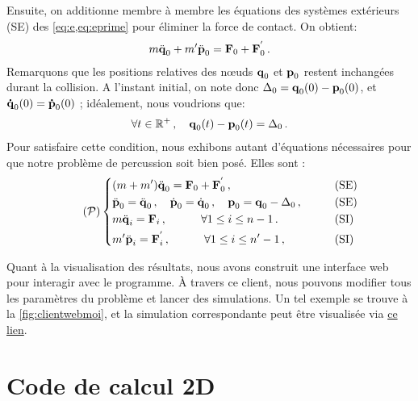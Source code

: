 \noindent Ensuite, on additionne membre à membre les équations des systèmes extérieurs (SE) des \cref{eq:e,eq:eprime} pour éliminer la force de contact. On obtient:
\begin{align}
m \ddot{\bm{\mathrm{q}}}_0 + m' \ddot{\bm{\mathrm{p}}}_0 = \bm{\mathrm{F}}_0 + \bm{\mathrm{F}}^{'}_0 \,.
\end{align}
Remarquons que les positions relatives des n\oe{}uds $\bm{\mathrm{q}}_0$ et $\bm{\mathrm{p}}_0$ restent inchangées durant la collision. A l'instant initial, on note donc $\Delta_0 = \bm{\mathrm{q}}_0(0) - \bm{\mathrm{p}}_0(0)$, et $\bm{\mathrm{\dot q}}_0(0) = \bm{\mathrm{\dot p}}_0(0)$ ; idéalement, nous voudrions que:
\begin{align}
\forall t \in \mathbb{R}^+ \,, \quad \bm{\mathrm{q}}_0(t) - \bm{\mathrm{p}}_0(t) = \Delta_0\,.
\end{align}
Pour satisfaire cette condition, nous exhibons autant d'équations nécessaires pour que notre problème de percussion soit bien posé. Elles sont :
\begin{align} \tag{$\mathcal{P}$} \label{eq:problemeP}
\begin{dcases}
    (m+m') \ddot{\bvec{q}}_0  = \bvec{F}_0 + \bvec{F}^{'}_0  \,, &\qquad \text{(SE)} \\
    \ddot{\bvec{p}}_0 = \ddot{\bvec{q}}_0 \,, \quad \dot{\bvec{p}}_0 = \dot{\bvec{q}}_0 \,, \quad \bvec{p}_0 = \bvec{q}_0 - \Delta_0 \,, &\qquad \text{(SE)} \\
    m \ddot{\bvec{q}}_i = \bvec{F}_i   \,, \quad \quad \quad \forall 1 \leq i \leq n-1 \,. &\qquad \text{(SI)} \\
    m' \ddot{\bvec{p}}_i = \bvec{F}^{'}_i   \,, \quad \quad \quad \forall 1 \leq i \leq n'-1 \,, &\qquad \text{(SI)}
\end{dcases}
\end{align}

Quant à la visualisation des résultats, nous avons construit une interface web pour interagir avec le programme. À travers ce client, nous pouvons modifier tous les paramètres du problème et lancer des simulations. Un tel exemple se trouve à la \cref{fig:clientwebmoi}, et la simulation correspondante peut être visualisée via \href{https://seafile.unistra.fr/f/8ab67b150b724e9baf6b/}{ce lien}. 





\section{Code de calcul 2D}


